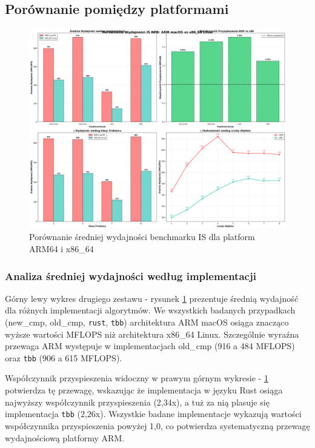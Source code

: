 \subsection{Porównanie pomiędzy platformami}
\begin{figure}[H]
    \centering
    \includegraphics[width=\textwidth]{analiza/images/parallel/is/compare/is_porownanie_platform_arm_vs_x86.png}
    \caption{Porównanie średniej wydajności benchmarku IS dla platform ARM64 i x86\_64}
    \label{is_porownanie_wydajnosci_platformy}
\end{figure}
\subsubsection{Analiza średniej wydajności według implementacji}
Górny lewy wykres drugiego zestawu - rysunek \ref{is_porownanie_wydajnosci_platformy} prezentuje średnią wydajność dla różnych implementacji algorytmów. We wszystkich badanych przypadkach (new\_cmp, old\_cmp, \texttt{rust}, \texttt{tbb}) architektura ARM macOS osiąga znacząco wyższe wartości MFLOPS niż architektura x86\_64 Linux. Szczególnie wyraźna przewaga ARM występuje w implementacjach old\_cmp (916 a 484 MFLOPS) oraz \texttt{tbb} (906 a 615 MFLOPS).

Współczynnik przyspieszenia widoczny w prawym górnym wykresie - \ref{is_porownanie_wydajnosci_platformy} potwierdza tę przewagę, wskazując że implementacja w języku Rust osiąga najwyższy współczynnik przyspieszenia (2,34x), a tuż za nią plasuje się implementacja \texttt{tbb} (2,26x). Wszystkie badane implementacje wykazują wartości współczynnika przyspieszenia powyżej 1,0, co potwierdza systematyczną przewagę wydajnościową platformy ARM.

